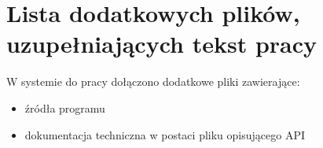 \chapter{Lista dodatkowych plików, uzupełniających tekst pracy} 


W systemie do pracy dołączono dodatkowe pliki zawierające:

\begin{itemize}
\item źródła programu
\item dokumentacja techniczna w postaci pliku opisującego API
\end{itemize}
